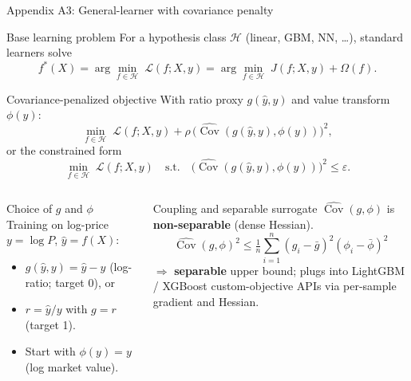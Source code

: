 \documentclass[aspectratio=169,12pt,]{beamer}
\newcommand{\Cov}{\operatorname{Cov}}
\newcommand{\1}{\mathbf{1}}
\renewcommand{\H}{\mathcal{H}}
\begin{document}
\begin{frame}{Appendix A3: General-learner with covariance penalty}

\vspace{-1mm}
\begin{block}{Base learning problem}
For a hypothesis class $\H$ (linear, GBM, NN, \dots), standard learners solve
\vspace{-1mm}
\[
f^*(X) = \arg\min_{f\in\H}\; \mathcal{L}(f; X, y) = \arg\min_{f\in\H}\; J(f; X, y) + \Omega(f).
\]
\end{block}

\begin{block}{Covariance-penalized objective}
With ratio proxy $g(\hat y, y)$ and value transform $\phi(y)$:
\vspace{-1mm}
\[
\min_{f\in\H}\; \mathcal{L}(f; X, y) + \rho\, \big(\widehat{\Cov}(g(\hat y, y), \phi(y))\big)^2,
\]
or the constrained form
\vspace{-1mm}
\[
\min_{f\in\H}\; \mathcal{L}(f; X, y)
\quad\text{s.t.}\quad
\big(\widehat{\Cov}(g(\hat y, y), \phi(y))\big)^2 \le \varepsilon.
\]
\end{block}

\begin{columns}[T,onlytextwidth]
\begin{block}{Choice of $g$ and $\phi$}
\footnotesize
Training on log-price $y=\log P$, $\hat y=f(X)$:
\begin{itemize}
    \item $g(\hat y, y) = \hat y - y$ (log-ratio; target 0), or
    \item $r = \hat y / y$ with $g = r$ (target 1).
    \item Start with $\phi(y) = y$ (log market value).
\end{itemize}
\end{block}

\begin{block}{Coupling and separable surrogate}
\footnotesize
$\widehat{\Cov}(g,\phi)$ is \textbf{non-separable} (dense Hessian).
\vspace{-1mm}
\[
\widehat{\Cov}(g,\phi)^2 \le \tfrac{1}{n}\sum_{i=1}^n (g_i - \bar g)^2 (\phi_i - \bar\phi)^2
\]
$\Rightarrow$ \textbf{separable} upper bound; plugs into LightGBM / XGBoost custom-objective APIs via per-sample gradient and Hessian.
\end{block}
\end{columns}

\end{frame}
\end{document}
